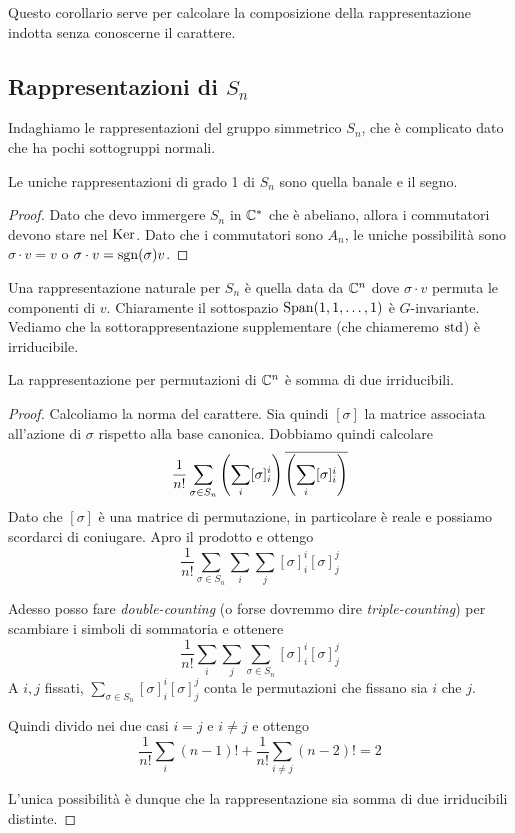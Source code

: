 		Questo corollario serve per calcolare la composizione della rappresentazione indotta senza conoscerne il carattere.
		

	
	\subsection{Rappresentazioni di $S_n$}
		Indaghiamo le rappresentazioni del gruppo simmetrico $S_n$, che è complicato dato che ha pochi sottogruppi normali.
		
		\begin{myprop}
		Le uniche rappresentazioni di grado 1 di $S_n$ sono quella banale e il segno.
		\end{myprop}
		\begin{proof}
		Dato che devo immergere $S_n$ in $\mathbb C^*$ che è abeliano, allora i commutatori devono stare nel $\operatorname{Ker}$. Dato che i commutatori sono $A_n$, le uniche possibilità sono $\sigma \cdot v = v$ o $\sigma \cdot v=\operatorname{sgn}(\sigma)v$.
		\end{proof}
		
		Una rappresentazione naturale per $S_n$ è quella data da $\mathbb C^n$ dove $\sigma \cdot v$ permuta le componenti di $v$. Chiaramente il sottospazio $\operatorname{Span}(1,1,\dots,1)$ è $G$-invariante. Vediamo che la sottorappresentazione supplementare (che chiameremo $\operatorname{std}$) è irriducibile.
		
		\begin{myprop}
		La rappresentazione per permutazioni di $\mathbb C^n$ è somma di due irriducibili.
		\end{myprop}
		\begin{proof}
		Calcoliamo la norma del carattere. Sia quindi $[\sigma]$ la matrice associata all'azione di $\sigma$ rispetto alla base canonica.
		Dobbiamo quindi calcolare
		\[
			\frac1{n!}\sum_{\sigma\in S_n} \left(\sum_i [\sigma]_i^i\right)\overline{\left(\sum_i[\sigma]_i^i\right)}
		\]
		Dato che $[\sigma]$ è una matrice di permutazione, in particolare è reale e possiamo scordarci di coniugare. Apro il prodotto e ottengo
		\[
			\frac1{n!}\sum_{\sigma\in S_n} \sum_i \sum_j [\sigma]_i^i[\sigma]_j^j
		\]
		
		Adesso posso fare \emph{double-counting} (o forse dovremmo dire \emph{triple-counting}) per scambiare i simboli di sommatoria e ottenere
		\[
			\frac1{n!}\sum_i \sum_j\sum_{\sigma\in S_n} [\sigma]_i^i[\sigma]_j^j      
		\]
		A $i,j$ fissati, $\sum_{\sigma\in S_n} [\sigma]_i^i[\sigma]_j^j$ conta le permutazioni che fissano sia $i$ che $j$.
		
		Quindi divido nei due casi $i=j$ e $i\ne j$ e ottengo
		\[
			\frac1{n!}\sum_i (n-1)! +  \frac1{n!}\sum_{i\ne j} (n-2)! = 2
		\]
		
		L'unica possibilità è dunque che la rappresentazione sia somma di due irriducibili distinte.
		\end{proof}
	






